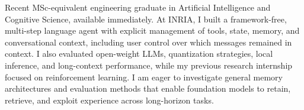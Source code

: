 
\begin{cvparagraph}
Recent MSc-equivalent engineering graduate in Artificial Intelligence and Cognitive Science, available immediately. At INRIA, I built a framework-free, multi-step language agent with explicit management of tools, state, memory, and conversational context, including user control over which messages remained in context. I also evaluated open-weight LLMs, quantization strategies, local inference, and long-context performance, while my previous research internship focused on reinforcement learning. I am eager to investigate general memory architectures and evaluation methods that enable foundation models to retain, retrieve, and exploit experience across long-horizon tasks.
\end{cvparagraph}
